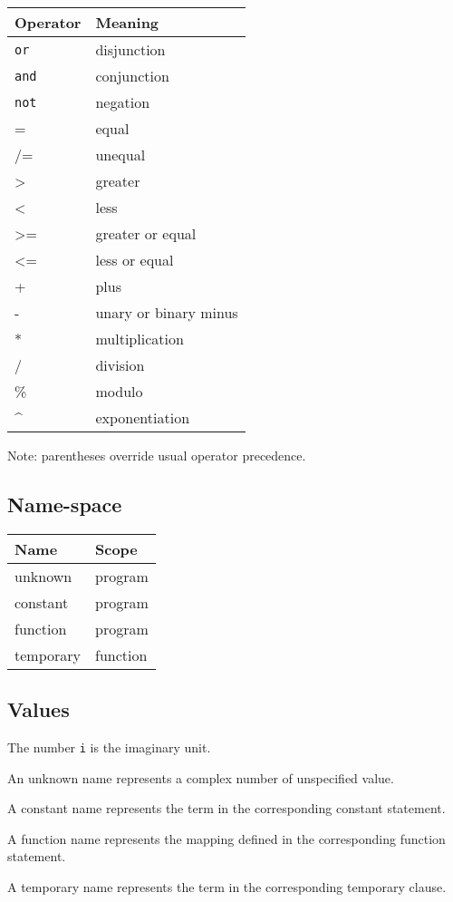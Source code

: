 \documentclass[letterpaper, 12pt]{extarticle}
\theoremstyle{definition} %
\newcommand{\code}[1]{\texttt{#1}}
\begin{document}
\begin{tabular}{l|l}
Operator & Meaning \\ \toprule
\code{or} & disjunction \\
\code{and} & conjunction \\
\code{not} & negation \\
= & equal \\
/= & unequal \\
\textgreater & greater \\
\textless & less \\
\textgreater= & greater or equal \\
\textless= & less or equal \\
+ & plus \\
- & unary or binary minus \\
* & multiplication \\
/ & division \\
\% & modulo \\
\^{} & exponentiation
\end{tabular}

Note: parentheses override usual operator precedence.

\subsection{Name-space}

\begin{tabular}{l|l}
Name & Scope \\ \toprule
unknown & program \\
constant & program \\
function & program \\
temporary & function
\end{tabular}

\subsection{Values}

The number \code{i} is the imaginary unit.

An unknown name represents a complex number
of unspecified value.

A constant name represents the term
in the corresponding constant statement.

A function name represents the mapping
defined in the corresponding function statement.

A temporary name represents the term
in the corresponding temporary clause.
\end{document}
